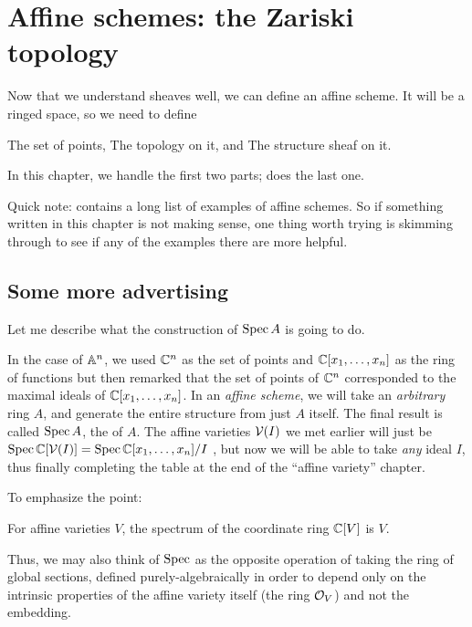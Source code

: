 \chapter{Affine schemes: the Zariski topology}
\label{ch:spec_zariski}
Now that we understand sheaves well,
we can define an affine scheme.
It will be a ringed space, so we need to define
\begin{itemize}
	\ii The set of points,
	\ii The topology on it, and
	\ii The structure sheaf on it.
\end{itemize}
In this chapter, we handle the first two parts;
 does the last one.

Quick note: 
contains a long list of examples of affine schemes.
So if something written in this chapter is not making sense,
one thing worth trying is skimming through 
to see if any of the examples there are more helpful.

\section{Some more advertising}
Let me describe what the construction of $\operatorname{Spec} A$ is going to do.

In the case of $\mathbb A^n$, we used $\mathbb C^n$ as the set of points
and $\mathbb C[x_1, \dots, x_n]$ as the ring of functions
but then remarked that the set of points
of $\mathbb C^n$ corresponded to the maximal ideals of $\mathbb C[x_1, \dots, x_n]$.
In an \emph{affine scheme}, we will take an \emph{arbitrary} ring $A$,
and generate the entire structure from just $A$ itself.
The final result is called $\operatorname{Spec} A$, the  of $A$.
The affine varieties $\mathcal V(I)$ we met earlier will just be
$\operatorname{Spec} \mathbb C[\mathcal V(I)] = \operatorname{Spec} \mathbb C[x_1, \dots, x_n] / I$
, but now we will be able to take
\emph{any} ideal $I$, thus finally completing the table at the end
of the ``affine variety'' chapter.

To emphasize the point:
\begin{moral}
	For affine varieties $V$, the spectrum of the coordinate ring $\mathbb C[V]$ is $V$.
\end{moral}
Thus, we may also think of $\operatorname{Spec}$ as the opposite operation of taking the
ring of global sections, defined purely-algebraically in order to depend only on
the intrinsic properties of the affine variety itself (the ring $\mathcal O_V$) and not
the embedding.

